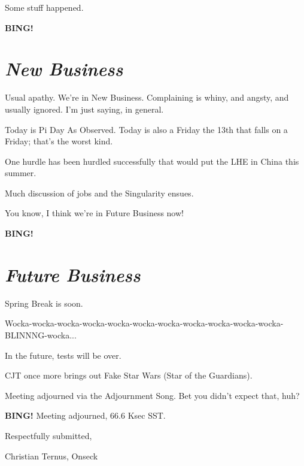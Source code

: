 \documentclass[10pt]{article}
\newcommand{\bing}{{\bf BING!} }
\newcommand{\goto}[1]{\bing \vskip 12pt \section*{{\em{#1}}}}
\begin{document}
Some stuff happened.

\goto{New Business}

Usual apathy.  We're in New Business.  Complaining is whiny, and
angsty, and usually ignored.  I'm just saying, in general.

Today is Pi Day As Observed.  Today is also a Friday the 13th that
falls on a Friday; that's the worst kind.

One hurdle has been hurdled successfully that would put the LHE in
China this summer.

Much discussion of jobs and the Singularity ensues.

You know, I think we're in Future Business now!

\goto{Future Business}

Spring Break is soon.

Wocka-wocka-wocka-wocka-wocka-wocka-wocka-wocka-wocka-wocka-wocka-BLINNNG-wocka...

In the future, tests will be over.

CJT once more brings out Fake Star Wars (Star of the Guardians).

Meeting adjourned via the Adjournment Song.  Bet you didn't expect that, huh?

\bing
\noindent
Meeting adjourned, 66.6 Ksec SST.

\vspace{18pt}

\centerline{Respectfully submitted,}
\centerline{Christian Ternus, Onseck}
\end{document}
